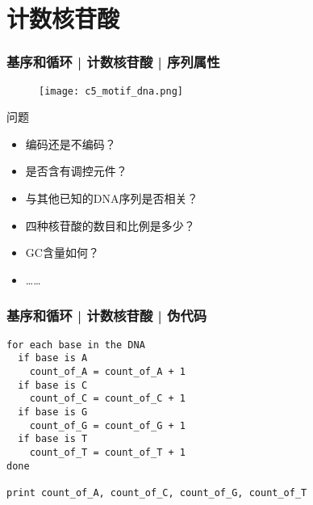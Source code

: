 \section{计数核苷酸}
\begin{frame}
  \frametitle{基序和循环 | 计数核苷酸 | 序列属性}
  \begin{figure}
    \centering
    \texttt{[image: c5\_motif\_dna.png]}
  \end{figure}
  \pause
  \vspace{-1em}
  \begin{block}{问题}
    \begin{itemize}
      \item 编码还是不编码？
      \item 是否含有调控元件？
      \item 与其他已知的DNA序列是否相关？
      \item 四种核苷酸的数目和比例是多少？
      \item GC含量如何？
      \item ……
    \end{itemize}
  \end{block}
\end{frame}

\begin{frame}[fragile]
  \frametitle{基序和循环 | 计数核苷酸 | 伪代码}
\begin{lstlisting}
for each base in the DNA
  if base is A
    count_of_A = count_of_A + 1
  if base is C
    count_of_C = count_of_C + 1
  if base is G
    count_of_G = count_of_G + 1
  if base is T
    count_of_T = count_of_T + 1
done

print count_of_A, count_of_C, count_of_G, count_of_T
\end{lstlisting}
\end{frame}

